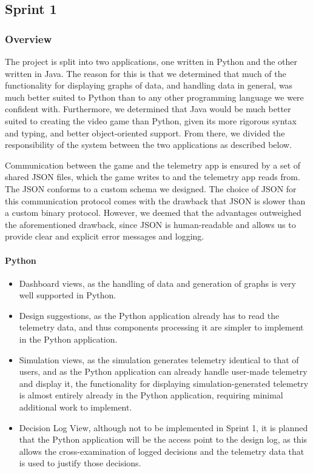 \subsection{Sprint 1}

\subsubsection{Overview}
The project is split into two applications, one written in Python and the other written in Java. The reason for this is that we determined that much of the functionality for displaying graphs of data, and handling data in general, was much better suited to Python than to any other programming language we were confident with. Furthermore, we determined that Java would be much better suited to creating the video game than Python, given its more rigorous syntax and typing, and better object-oriented support. From there, we divided the responsibility of the system between the two applications as described below.

Communication between the game and the telemetry app is ensured by a set of shared JSON files, which the game writes to and the telemetry app reads from. The JSON conforms to a custom schema we designed. The choice of JSON for this communication protocol comes with the drawback that JSON is slower than a custom binary protocol. However, we deemed that the advantages outweighed the aforementioned drawback, since JSON is human-readable and allows us to provide clear and explicit error messages and logging.

\paragraph{Python}
\begin{itemize}
    \item Dashboard views, as the handling of data and generation of graphs is very well supported in Python.
    \item Design suggestions, as the Python application already has to read the telemetry data, and thus components processing it are simpler to implement in the Python application.
    \item Simulation views, as the simulation generates telemetry identical to that of users, and as the Python application can already handle user-made telemetry and display it, the functionality for displaying simulation-generated telemetry is almost entirely already in the Python application, requiring minimal additional work to implement.
    \item Decision Log View, although not to be implemented in Sprint 1, it is planned that the Python application will be the access point to the design log, as this allows the cross-examination of logged decisions and the telemetry data that is used to justify those decisions.
\end{itemize}

